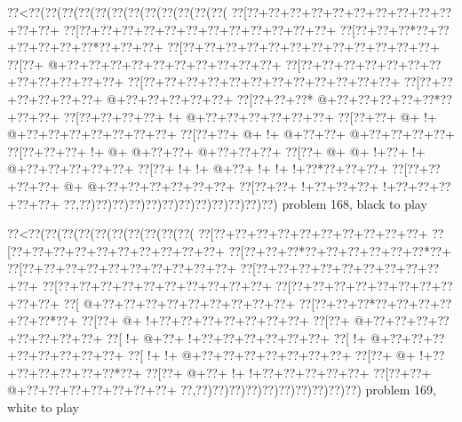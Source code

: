 \vbox{\vbox{\goo
\0??<\0??(\0??(\0??(\0??(\0??(\0??(\0??(\0??(\0??(\0??(\0??(\0??(
\0??[\0??+\0??+\0??+\0??+\0??+\0??+\0??+\0??+\0??+\0??+\0??+\0??+
\0??[\0??+\0??+\0??+\0??+\0??+\0??+\0??+\0??+\0??+\0??+\0??+\0??+
\0??[\0??+\0??+\0??*\0??+\0??+\0??+\0??+\0??+\0??*\0??+\0??+\0??+
\0??[\0??+\0??+\0??+\0??+\0??+\0??+\0??+\0??+\0??+\0??+\0??+\0??+
\0??[\0??+\- @+\0??+\0??+\0??+\0??+\0??+\0??+\0??+\0??+\0??+\0??+
\0??[\0??+\0??+\0??+\0??+\0??+\0??+\0??+\0??+\0??+\0??+\0??+\0??+
\0??[\0??+\0??+\0??+\0??+\0??+\0??+\0??+\0??+\0??+\0??+\0??+\0??+
\0??[\0??+\0??+\0??+\0??+\0??+\0??+\- @+\0??+\0??+\0??+\0??+\0??+
\0??[\0??+\0??+\0??*\- @+\0??+\0??+\0??+\0??+\0??*\0??+\0??+\0??+
\0??[\0??+\0??+\0??+\0??+\- !+\- @+\0??+\0??+\0??+\0??+\0??+\0??+
\0??[\0??+\0??+\- @+\- !+\- @+\0??+\0??+\0??+\0??+\0??+\0??+\0??+
\0??[\0??+\0??+\- @+\- !+\- @+\0??+\0??+\- @+\0??+\0??+\0??+\0??+
\0??[\0??+\0??+\0??+\- !+\- @+\- @+\0??+\0??+\- @+\0??+\0??+\0??+
\0??[\0??+\- @+\- @+\- !+\0??+\- !+\- @+\0??+\0??+\0??+\0??+\0??+
\0??[\0??+\- !+\- !+\- @+\0??+\- !+\- !+\- !+\0??*\0??+\0??+\0??+
\0??[\0??+\0??+\0??+\0??+\- @+\- @+\0??+\0??+\0??+\0??+\0??+\0??+
\0??[\0??+\0??+\- !+\0??+\0??+\0??+\- !+\0??+\0??+\0??+\0??+\0??+
\0??,\0??)\0??)\0??)\0??)\0??)\0??)\0??)\0??)\0??)\0??)\0??)\0??)
}
\hfil problem 168, black to play\hfil\break
}

\vbox{\vbox{\goo
\0??<\0??(\0??(\0??(\0??(\0??(\0??(\0??(\0??(\0??(\0??(
\0??[\0??+\0??+\0??+\0??+\0??+\0??+\0??+\0??+\0??+\0??+
\0??[\0??+\0??+\0??+\0??+\0??+\0??+\0??+\0??+\0??+\0??+
\0??[\0??+\0??+\0??*\0??+\0??+\0??+\0??+\0??+\0??*\0??+
\0??[\0??+\0??+\0??+\0??+\0??+\0??+\0??+\0??+\0??+\0??+
\0??[\0??+\0??+\0??+\0??+\0??+\0??+\0??+\0??+\0??+\0??+
\0??[\0??+\0??+\0??+\0??+\0??+\0??+\0??+\0??+\0??+\0??+
\0??[\0??+\0??+\0??+\0??+\0??+\0??+\0??+\0??+\0??+\0??+
\0??[\- @+\0??+\0??+\0??+\0??+\0??+\0??+\0??+\0??+\0??+
\0??[\0??+\0??+\0??*\0??+\0??+\0??+\0??+\0??+\0??*\0??+
\0??[\0??+\- @+\- !+\0??+\0??+\0??+\0??+\0??+\0??+\0??+
\0??[\0??+\- @+\0??+\0??+\0??+\0??+\0??+\0??+\0??+\0??+
\0??[\- !+\- @+\0??+\- !+\0??+\0??+\0??+\0??+\0??+\0??+
\0??[\- !+\- @+\0??+\0??+\0??+\0??+\0??+\0??+\0??+\0??+
\0??[\- !+\- !+\- @+\0??+\0??+\0??+\0??+\0??+\0??+\0??+
\0??[\0??+\- @+\- !+\0??+\0??+\0??+\0??+\0??+\0??*\0??+
\0??[\0??+\- @+\0??+\- !+\- !+\0??+\0??+\0??+\0??+\0??+
\0??[\0??+\0??+\- @+\0??+\0??+\0??+\0??+\0??+\0??+\0??+
\0??,\0??)\0??)\0??)\0??)\0??)\0??)\0??)\0??)\0??)\0??)
}
\hfil problem 169, white to play\hfil\break
}

